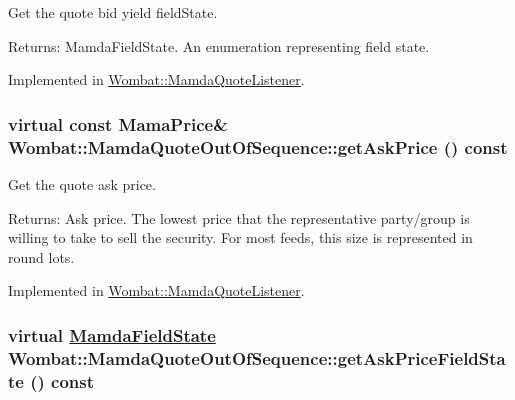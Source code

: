Get the quote bid yield field\-State. 

\begin{Desc}
\item[Returns:]Mamda\-Field\-State. An enumeration representing field state. \end{Desc}


Implemented in \hyperlink{classWombat_1_1MamdaQuoteListener_01e681d0b51718516807df702714f7ba}{Wombat::Mamda\-Quote\-Listener}.\hypertarget{classWombat_1_1MamdaQuoteOutOfSequence_59c673bb5940ecc1b3096a7e523eaf2f}{
\subsubsection[getAskPrice]{\setlength{\rightskip}{0pt plus 5cm}virtual const Mama\-Price\& Wombat::Mamda\-Quote\-Out\-Of\-Sequence::get\-Ask\-Price () const}}
\label{classWombat_1_1MamdaQuoteOutOfSequence_59c673bb5940ecc1b3096a7e523eaf2f}


Get the quote ask price. 

\begin{Desc}
\item[Returns:]Ask price. The lowest price that the representative party/group is willing to take to sell the security. For most feeds, this size is represented in round lots. \end{Desc}


Implemented in \hyperlink{classWombat_1_1MamdaQuoteListener_b4c49376d3d07db48065adc6d74da196}{Wombat::Mamda\-Quote\-Listener}.\hypertarget{classWombat_1_1MamdaQuoteOutOfSequence_40369fc6cc5d586d7be261e868895988}{
\subsubsection[getAskPriceFieldState]{\setlength{\rightskip}{0pt plus 5cm}virtual \hyperlink{namespaceWombat_93aac974f2ab713554fd12a1fa3b7d2a}{Mamda\-Field\-State} Wombat::Mamda\-Quote\-Out\-Of\-Sequence::get\-Ask\-Price\-Field\-State () const}}
\label{classWombat_1_1MamdaQuoteOutOfSequence_40369fc6cc5d586d7be261e868895988}


